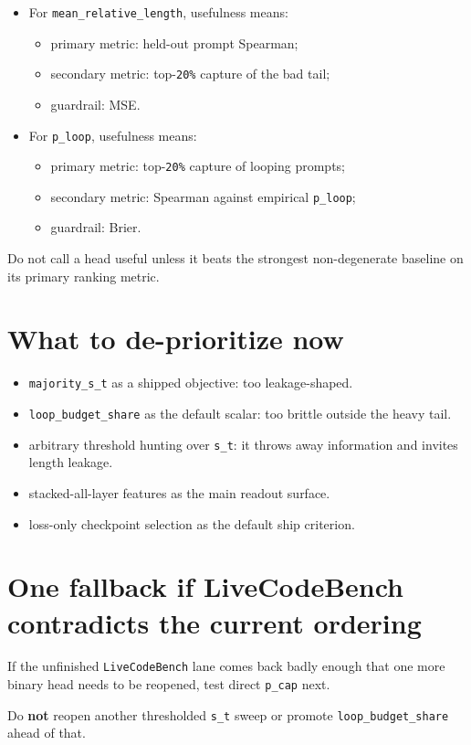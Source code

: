\documentclass[11pt]{article}
\begin{document}
\begin{itemize}[leftmargin=1.5em]
\item For \texttt{mean\_relative\_length}, usefulness means:
  \begin{itemize}[leftmargin=1.5em]
  \item primary metric: held-out prompt Spearman;
  \item secondary metric: top-\texttt{20\%} capture of the bad tail;
  \item guardrail: MSE.
  \end{itemize}
\item For \texttt{p\_loop}, usefulness means:
  \begin{itemize}[leftmargin=1.5em]
  \item primary metric: top-\texttt{20\%} capture of looping prompts;
  \item secondary metric: Spearman against empirical \texttt{p\_loop};
  \item guardrail: Brier.
  \end{itemize}
\end{itemize}

Do not call a head useful unless it beats the strongest non-degenerate baseline on
its primary ranking metric.

\section*{What to de-prioritize now}
\begin{itemize}[leftmargin=1.5em]
\item \texttt{majority\_s\_t} as a shipped objective: too leakage-shaped.
\item \texttt{loop\_budget\_share} as the default scalar: too brittle outside the heavy tail.
\item arbitrary threshold hunting over \texttt{s\_t}: it throws away information and
invites length leakage.
\item stacked-all-layer features as the main readout surface.
\item loss-only checkpoint selection as the default ship criterion.
\end{itemize}

\section*{One fallback if LiveCodeBench contradicts the current ordering}
If the unfinished \texttt{LiveCodeBench} lane comes back badly enough that one more
binary head needs to be reopened, test direct \texttt{p\_cap} next.

Do \textbf{not} reopen another thresholded \texttt{s\_t} sweep or promote
\texttt{loop\_budget\_share} ahead of that.
\end{document}

